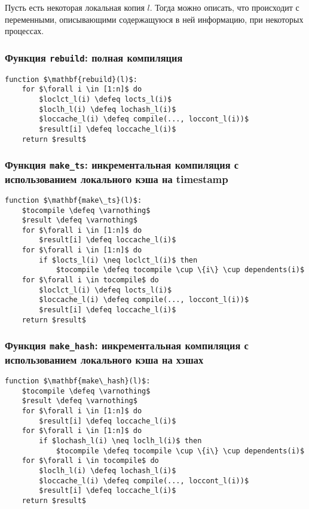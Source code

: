 Пусть есть некоторая локальная копия $l$. Тогда можно описать, что происходит с переменными, описывающими содержащуюся в ней информацию, при некоторых процессах.\\

\subsubsection[Функция \texttt{rebuild}]{Функция \texttt{rebuild}: полная компиляция}
\begin{lstlisting}
function $\mathbf{rebuild}(l)$:
	for $\forall i \in [1:n]$ do
		$loclct_l(i) \defeq locts_l(i)$
		$loclh_l(i) \defeq lochash_l(i)$
		$loccache_l(i) \defeq compile(..., loccont_l(i))$
		$result[i] \defeq loccache_l(i)$
	return $result$
\end{lstlisting}

\subsubsection[Функция \texttt{make\_ts}]{Функция \texttt{make\_ts}: инкрементальная компиляция с использованием локального кэша на timestamp}
\begin{lstlisting}
function $\mathbf{make\_ts}(l)$:
	$tocompile \defeq \varnothing$
	$result \defeq \varnothing$
	for $\forall i \in [1:n]$ do
		$result[i] \defeq loccache_l(i)$
	for $\forall i \in [1:n]$ do
		if $locts_l(i) \neq loclct_l(i)$ then
			$tocompile \defeq tocompile \cup \{i\} \cup dependents(i)$
	for $\forall i \in tocompile$ do
		$loclct_l(i) \defeq locts_l(i)$
		$loccache_l(i) \defeq compile(..., loccont_l(i))$
		$result[i] \defeq loccache_l(i)$
	return $result$
\end{lstlisting}

\subsubsection[Функция \texttt{make\_hash}]{Функция \texttt{make\_hash}: инкрементальная компиляция с использованием локального кэша на хэшах}
\begin{lstlisting}
function $\mathbf{make\_hash}(l)$:
	$tocompile \defeq \varnothing$
	$result \defeq \varnothing$
	for $\forall i \in [1:n]$ do
		$result[i] \defeq loccache_l(i)$
	for $\forall i \in [1:n]$ do
		if $lochash_l(i) \neq loclh_l(i)$ then
			$tocompile \defeq tocompile \cup \{i\} \cup dependents(i)$
	for $\forall i \in tocompile$ do
		$loclh_l(i) \defeq lochash_l(i)$
		$loccache_l(i) \defeq compile(..., loccont_l(i))$
		$result[i] \defeq loccache_l(i)$
	return $result$
\end{lstlisting}

